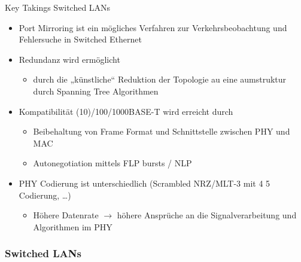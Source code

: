 \begin{KR}{Key Takings Switched LANs}
    \begin{itemize}
        \item Port Mirroring ist ein mögliches Verfahren zur Verkehrsbeobachtung und Fehlersuche in Switched Ethernet
        \item Redundanz wird ermöglicht
        \begin{itemize}
            \item durch die „künstliche“ Reduktion der Topologie au eine aumstruktur durch Spanning Tree Algorithmen
        \end{itemize}
        \item Kompatibilität (10)/100/1000BASE-T wird erreicht durch
        \begin{itemize}
            \item Beibehaltung von Frame Format und Schnittstelle zwischen PHY und MAC
            \item Autonegotiation mittels FLP bursts / NLP
        \end{itemize}
        \item PHY Codierung ist unterschiedlich (Scrambled NRZ/MLT-3 mit 4 5 Codierung, …)
        \begin{itemize}
            \item Höhere Datenrate $\rightarrow$ höhere Ansprüche an die Signalverarbeitung und Algorithmen im PHY
        \end{itemize}
    \end{itemize}
\end{KR}


\subsubsection*{Switched LANs}



